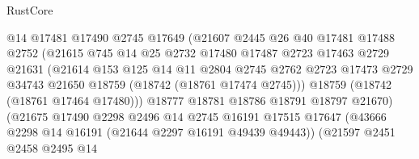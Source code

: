 \begin{lexlean}{RustCore}
\begin{coremodule}
                                @14
                                @17481
                                @17490
                                @2745
                                @17649
                                (@21607
                                  @2445
                                  @26
                                  @40
                                  @17481
                                  @17488
                                  @2752
                                  (@21615
                                    @745
                                    @14
                                    @25
                                    @2732
                                    @17480
                                    @17487
                                    @2723
                                    @17463
                                    @2729
                                    @21631
                                    (@21614
                                      @153
                                      @125
                                      @14
                                      @11
                                      @2804
                                      @2745
                                      @2762
                                      @2723
                                      @17473
                                      @2729
                                      @34743
                                      @21650
                                      @18759
                                      (@18742 (@18761 @17474 @2745)))
                                    @18759
                                    (@18742 (@18761 @17464 @17480)))
                                  @18777
                                  @18781
                                  @18786
                                  @18791
                                  @18797
                                  @21670)
                                (@21675
                                  @17490
                                  @2298
                                  @2496
                                  @14
                                  @2745
                                  @16191
                                  @17515
                                  @17647
                                  (@43666 @2298 @14 @16191 (@21644 @2297 @16191 @49439 @49443))
                                  (@21597
                                    @2451
                                    @2458
                                    @2495
                                    @14

\end{coremodule}
\end{lexlean}
